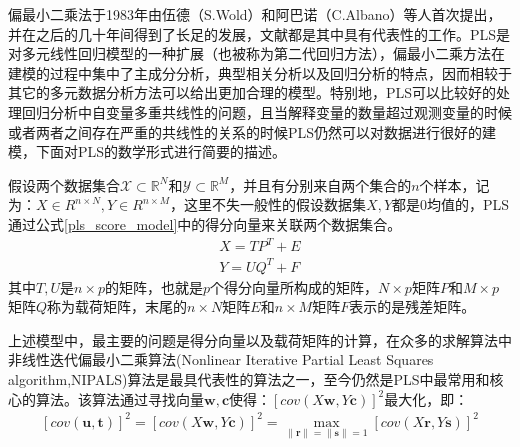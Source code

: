 偏最小二乘法于1983年由伍德（S.Wold）和阿巴诺（C.Albano）等人首次提出，并在之后的几十年间得到了长足的发展，文献\cite{KPLS,pls_PLS,pls_PLSR,pls_PLSR2,pls_PLSALL}都是其中具有代表性的工作。PLS是对多元线性回归模型的一种扩展（也被称为第二代回归方法），偏最小二乘方法在建模的过程中集中了主成分分析，典型相关分析以及回归分析的特点，因而相较于其它的多元数据分析方法可以给出更加合理的模型。特别地，PLS可以比较好的处理回归分析中自变量多重共线性的问题，且当解释变量的数量超过观测变量的时候或者两者之间存在严重的共线性的关系的时候PLS仍然可以对数据进行很好的建模，下面对PLS的数学形式进行简要的描述。

假设两个数据集合${\mathcal{X} \subset \mathbb{R}^{N}}$和${\mathcal{Y} \subset \mathbb{R}^{M}}$，并且有分别来自两个集合的$n$个样本，记为：${X \in R^{n\times N},Y \in R^{n\times M}}$，这里不失一般性的假设数据集${X,Y}$都是${0}$均值的，PLS通过公式\ref{pls_score_model}中的得分向量来关联两个数据集合。
\begin{equation}
\begin{split}
\label{pls_score_model}
{X=TP^{T}+E}\\
{Y=UQ^{T}+F}
\end{split}
\end{equation}
其中${T,U}$是$n \times p$的矩阵，也就是$p$个得分向量所构成的矩阵，$N \times p$矩阵${P}$和$M \times p$矩阵${Q}$称为载荷矩阵，末尾的$n \times N$矩阵${E}$和$n \times M$矩阵${F}$表示的是残差矩阵。

上述模型中，最主要的问题是得分向量以及载荷矩阵的计算，在众多的求解算法中非线性迭代偏最小二乘算法(Nonlinear Iterative Partial Least Squares algorithm,NIPALS)\cite{pls_NIPALS}算法是最具代表性的算法之一，至今仍然是PLS中最常用和核心的算法。该算法通过寻找向量$\bm{w,c}$使得：$[cov(X\bm{w},Y\bm{c})]^2$最大化，即：
\begin{equation}
\label{pls_max_cov}
\begin{split}
[cov(\bm{u},\bm{t})]^2=[cov(X\bm{w},Y\bm{c})]^2=\max_{\|\bm{r}\|=\|\bm{s}\|=1}[cov(X\bm{r},Y\bm{s})]^2
\end{split}
\end{equation}

